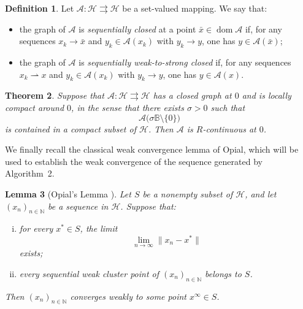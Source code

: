 \documentclass[11pt]{article}
\newtheorem{theorem}{Theorem}[section]
\newtheorem{lemma}[theorem]{Lemma}
\theoremstyle{definition}
\newtheorem{definition}[theorem]{Definition}
\theoremstyle{definition}
\theoremstyle{definition}
\newcommand{\dom}{\ensuremath{\operatorname{dom}}}
\begin{document}
\begin{definition}\label{closed graph}
Let $\mathcal{A}:\mathcal{H}\rightrightarrows\mathcal{H}$ be a set-valued
mapping. We say that:

\begin{itemize}
    \item the graph of $\mathcal{A}$ is  \emph{sequentially   closed }at a  point 
    $\bar{x}\in\dom\mathcal{A}$ if, for any sequences
    $x_k\to\bar{x}$ and $y_k\in\mathcal{A}(x_k)$ with $y_k\to y$, one has
    $y\in\mathcal{A}(\bar{x})$;

    \item the graph of $\mathcal{A}$ is \emph{sequentially weak-to-strong
    closed} if, for any sequences $x_k\rightharpoonup x$ and
    $y_k\in\mathcal{A}(x_k)$ with $y_k\to y$, one has
    $y\in\mathcal{A}(x)$.
\end{itemize}
\end{definition}

\begin{theorem}\label{compact}
\cite{LMT1,LT}
Suppose that $\mathcal{A}:\mathcal{H}\rightrightarrows\mathcal{H}$ has a
closed graph at $0$ and is locally compact around $0$, in the sense that
there exists $\sigma>0$ such that
\[
\mathcal{A}\bigl(\sigma\mathbb{B}\setminus\{0\}\bigr)
\]
is contained in a compact subset of $\mathcal{H}$. Then $\mathcal{A}$ is
$R$-continuous at $0$.
\end{theorem}

We finally recall the classical weak convergence lemma of Opial, which will be used to establish the weak convergence of the sequence generated by Algorithm~2.

\begin{lemma}[Opial's Lemma {\cite{Opial}}]\label{lem:Opial}
Let $S$ be a nonempty subset of $\mathcal{H}$, and let $(x_n)_{n\in\mathbb{N}}$ be a sequence in $\mathcal{H}$. Suppose that:
\begin{enumerate}[(i)]
    \item for every $x^*\in S$, the limit
    \[
    \lim_{n\to\infty}\|x_n-x^*\|
    \]
    exists;
     \item every sequential weak cluster point of $(x_n)_{n\in\mathbb{N}}$ belongs to $S$.
\end{enumerate}
Then $(x_n)_{n\in\mathbb{N}}$ converges weakly to some point $x^\infty\in S$.
\end{lemma}





\end{document}
